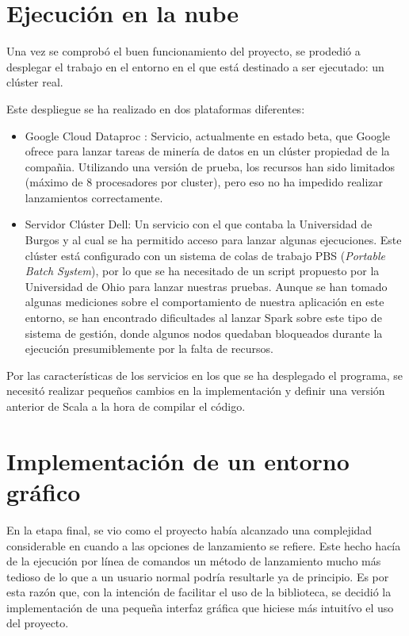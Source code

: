 \section{Ejecución en la nube}

Una vez se comprobó el buen funcionamiento del proyecto, se prodedió a desplegar el trabajo en el entorno en el que está destinado a ser ejecutado: un clúster real.

Este despliegue se ha realizado en dos plataformas diferentes:
\begin{itemize}
	\item Google Cloud Dataproc \cite{dataprocSoft}: Servicio, actualmente en estado beta, que Google ofrece para lanzar tareas de minería de datos en un clúster propiedad de la compañia. Utilizando una versión de prueba, los recursos han sido limitados (máximo de 8 procesadores por cluster), pero eso no ha impedido realizar lanzamientos correctamente.  
	\item Servidor Clúster Dell: Un servicio con el que contaba la Universidad de Burgos y al cual se ha permitido acceso para lanzar algunas ejecuciones. Este clúster está configurado con un sistema de colas de trabajo PBS (\textit{Portable Batch System}), por lo que se ha necesitado de un script propuesto por la Universidad de Ohio \cite{baer2015integrating} para lanzar nuestras pruebas. Aunque se han tomado algunas mediciones sobre el comportamiento de nuestra aplicación en este entorno, se han encontrado dificultades al lanzar Spark sobre este tipo de sistema de gestión, donde algunos nodos quedaban bloqueados durante la ejecución presumiblemente por la falta de recursos.
\end{itemize}

Por las características de los servicios en los que se ha desplegado el programa, se necesitó realizar pequeños cambios en la implementación y definir una versión anterior de Scala a la hora de compilar el código.

\section{Implementación de un entorno gráfico}

En la etapa final, se vio como el proyecto había alcanzado una complejidad considerable en cuando a las opciones de lanzamiento se refiere. Este hecho hacía de la ejecución por línea de comandos un método de lanzamiento mucho más tedioso de lo que a un usuario normal podría resultarle ya de principio. Es por esta razón que, con la intención de facilitar el uso de la biblioteca, se decidió la implementación de una pequeña interfaz gráfica que hiciese más intuitívo el uso del proyecto.

